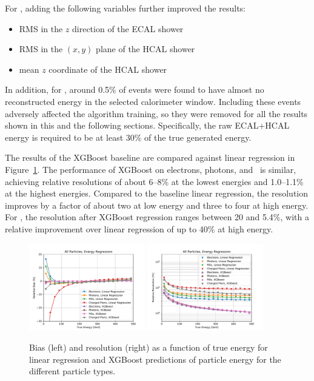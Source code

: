 For \chpi, adding the following variables further improved the results:

\begin{itemize}
\item RMS in the $z$ direction of the ECAL shower
\item RMS in the $(x,y)$ plane of the HCAL shower
\item mean $z$ coordinate of the HCAL shower
\end{itemize}

In addition, for \chpi, around 0.5\% of events were found to have almost no reconstructed energy in the selected calorimeter window.  Including these events adversely affected the algorithm training, so they were removed for all the results shown in this and the following sections. Specifically, the raw ECAL+HCAL energy is required to be at least 30\% of the true generated energy.

The results of the XGBoost baseline are compared against linear regression in Figure~\ref{fig:reg_xgb_linreg}. The performance of XGBoost on electrons, photons, and \pizero\ is similar, achieving relative resolutions of about 6--8\% at the lowest energies and 1.0--1.1\% at the highest energies.  Compared to the baseline linear regression, the resolution improves by a factor of about two at low energy and three to four at high energy.  For \chpi, the resolution after XGBoost regression ranges between 20 and 5.4\%, with a relative improvement over linear regression of up to 40\% at high energy.

\begin{figure}[htbp]
\centering
\includegraphics[width=0.45\textwidth]{Images/Calo/bias_vs_E_allparts_linreg_xgb.pdf}
\includegraphics[width=0.45\textwidth]{Images/Calo/res_vs_E_allparts_linreg_xgb_fits.pdf}
\caption{Bias (left) and resolution (right) as a function of true energy for linear regression and XGBoost  predictions of particle energy for the different particle types.\label{fig:reg_xgb_linreg}}
\end{figure}

